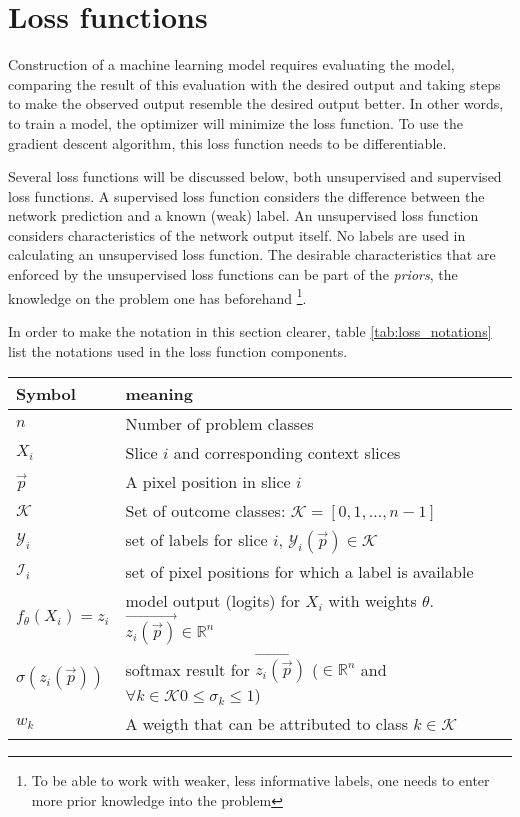 
\section{Loss functions\label{sec:LossFunctions}}

Construction of a machine learning model requires evaluating the model, comparing the result of this evaluation with the desired output and taking steps to make the observed output resemble the desired output better.
In other words, to train a model, the optimizer will minimize the loss function.
To use the gradient descent algorithm, this loss function needs to be differentiable.

Several loss functions will be discussed below, both unsupervised and supervised loss functions.
A supervised loss function considers the difference between the network prediction and a known (weak) label.
An unsupervised loss function considers characteristics of the network output itself. No labels are used in calculating an unsupervised loss function.
The desirable characteristics that are enforced by the unsupervised loss functions can be part of the \textit{priors}, the knowledge on the problem one has beforehand
\footnote{To be able to work with weaker, less informative labels, one needs to enter more prior knowledge into the problem}. 


In order to make the notation in this section clearer, table \ref{tab:loss_notations} list the notations used in the loss function components.

\begin{SCtable}[\sidecaptionrelwidth][h]
 
    \begin{tabular}{ l l } 
     \hline
     \hline
     Symbol & meaning \\
     \hline 
    $n$                 & Number of problem classes \\
    $X_i$               & Slice $i$ and corresponding context slices   \\ 
    $\vec{p}$           & A pixel position in slice $i$ \\
    $\mathcal{K}$       & Set of outcome classes: $\mathcal{K} = [0, 1, \dots, n-1]$ \\
    $\mathcal{Y}_i$     & set of labels for slice $i$, $\mathcal{Y}_i(\vec{p}) \in \mathcal{K}$  \\
    $\mathcal{I}_i$     & set of pixel positions for which a label is available \\
    $f_\theta(X_i)=z_i$ & model output (logits) for $X_i$ with weights $\theta$. $\vec{z_i(\vec{p})}\in \mathbb{R}^n$ \\
    $\sigma(z_i(\vec{p}))$   & softmax result for $\vec{z_i(\vec{p})}$ ($\in \mathbb{R}^n$ and $\forall k\in \mathcal{K} 0\leq\sigma_k\leq1$) \\
    $w_k$ & A weigth that can be attributed to class $k \in \mathcal{K}$ \\
     \hline
     \hline
    \end{tabular}
    \caption{List of symbols used in the loss functions\label{tab:loss_notations}}

\end{SCtable}

